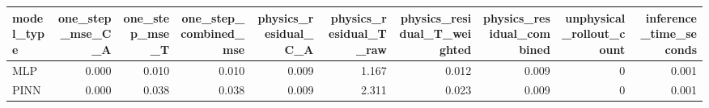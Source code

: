 \begin{tabular}{lrrrrrrrrr}
\toprule
model\_type & one\_step\_mse\_C\_A & one\_step\_mse\_T & one\_step\_combined\_mse & physics\_residual\_C\_A & physics\_residual\_T\_raw & physics\_residual\_T\_weighted & physics\_residual\_combined & unphysical\_rollout\_count & inference\_time\_seconds \\
\midrule
MLP & 0.000 & 0.010 & 0.010 & 0.009 & 1.167 & 0.012 & 0.009 & 0 & 0.001 \\
PINN & 0.000 & 0.038 & 0.038 & 0.009 & 2.311 & 0.023 & 0.009 & 0 & 0.001 \\
\bottomrule
\end{tabular}
